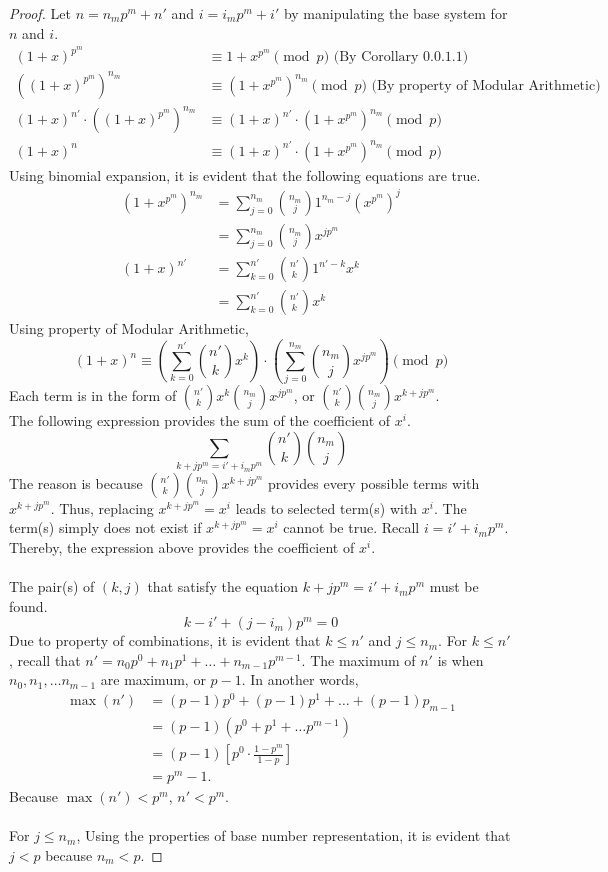 \documentclass{article}
\begin{document}
\begin{proof}
\noindent
Let $n=n_mp^m+n'$ and $i=i_mp^m+i'$ by manipulating the base system for $n$ and $i$.
\begin{align*}
    (1+x)^{p^m} &\equiv 1+x^{p^m} \pmod{p} \text{ (By Corollary 0.0.1.1)} \\
    \left((1+x)^{p^m}\right)^{n_m} &\equiv(1+x^{p^m})^{n_m} \pmod{p} \text{ (By property of Modular Arithmetic)} \\
    (1+x)^{n'} \cdot \left((1+x)^{p^m}\right)^{n_m} &\equiv (1+x)^{n'} \cdot (1+x^{p^m})^{n_m} \pmod{p} \\
    (1+x)^n &\equiv (1+x)^{n'} \cdot (1+x^{p^m})^{n_m} \pmod{p}
\end{align*}
Using binomial expansion, it is evident that the following equations are true.
\begin{align*}
    (1+x^{p^m})^{n_m} &= \sum_{j=0}^{n_m} \binom{n_m}{j} 1^{n_m-j}(x^{p^m})^j \\
    &= \sum_{j=0}^{n_m} \binom{n_m}{j} x^{jp^m}\\
    (1+x)^{n'} &= \sum_{k=0}^{n'} \binom{n'}{k} 1^{n'-k}x^k \\
    &= \sum_{k=0}^{n'} \binom{n'}{k} x^k
\end{align*}
Using property of Modular Arithmetic, 
\[(1+x)^n \equiv \left(\sum_{k=0}^{n'} \binom{n'}{k} x^{k}\right) \cdot \left(\sum_{j=0}^{n_m} \binom{n_m}{j} x^{jp^m}\right) \pmod{p}\]
Each term is in the form of $\binom{n'}{k}x^{k}\binom{n_m}{j} x^{jp^m}$, or $\binom{n'}{k}\binom{n_m}{j}x^{k+jp^m}$.
\\ The following expression provides the sum of the coefficient of $x^i$.
\[
\sum_{k+jp^m=i'+i_mp^m}^{}\binom{n'}{k}\binom{n_m}{j}
\]
The reason is because $\binom{n'}{k}\binom{n_m}{j}x^{k+jp^m}$ provides every possible terms with $x^{k+jp^m}$. Thus, replacing $x^{k+jp^m}=x^i$ leads to selected term(s) with $x^i$. The term(s) simply does not exist if $x^{k+jp^m}=x^i$ cannot be true. Recall $i=i'+i_mp^m$. Thereby, the expression above provides the coefficient of $x^i$.
\\\\
The pair(s) of $(k,j)$ that satisfy the equation $k+jp^m=i'+i_mp^m$ must be found.
\[
k-i'+(j-i_m)p^m=0
\]
Due to property of combinations, it is evident that $k \le n'$ and $j \le n_m$. For $k \le n'$, recall that $n'=n_0p^0+n_1p^1+\dots+n_{m-1}p^{m-1}$. The maximum of $n'$ is when $n_0,n_1,\dots n_{m-1}$ are maximum, or $p-1$. In another words,
\begin{align*}
\max(n')&=(p-1)p^0+(p-1)p^1+\dots+(p-1)p_{m-1} \\
&=(p-1)(p^0+p^1+\dots p^{m-1}) \\
&=(p-1)[p^0\cdot\frac{1-p^m}{1-p}] \\
&=p^m-1.
\end{align*}
Because $\max(n')<p^m$, $n'<p^m$.
\\\\
For $j \le n_m$, Using the properties of base number representation, it is evident that $j<p$ because $n_m<p$.
\end{proof}
\end{document}
